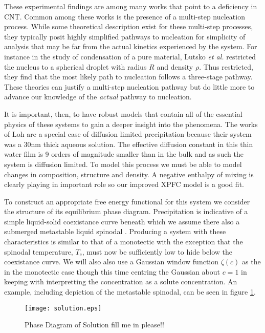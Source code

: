 These experimental findings are among many works that point to a deficiency in
CNT. Common among these works is the presence of a multi-step nucleation
process. While some theoretical description exist for these multi-step
processes, they typically posit highly simplified pathways to nucleation for
simplicity of analysis that may be far from the actual kinetics experienced by
the system.  For instance in the study of condensation of a pure material,
Lutsko \textit{et al.} \cite{LUTSKO15} restricted the nucleus to a spherical
droplet with radius $R$ and density $\rho$. Thus restricted, they find that the
most likely path to nucleation follows a three-stage pathway.  These theories
can justify a multi-step nucleation pathway but do little more to advance our
knowledge of the \textit{actual} pathway to nucleation.

It is important, then, to have robust models that contain all of the essential
physics of these systems to gain a deeper insight into the phenomena. The works
of Loh \cite{LOH17} are a special case of diffusion limited precipitation because
their system was a 30nm thick aqueous solution. The effective diffusion
constant in this thin water film is 9 orders of magnitude smaller than in the
bulk and as such the system is diffusion limited. To model this process we must
be able to  model changes in composition, structure and density. A negative
enthalpy of mixing is clearly playing in important role so our improved XPFC
model is a good fit.

To construct an appropriate free energy functional for this system we consider
the structure of its equilibrium phase diagram. Precipitation is indicative of
a simple liquid-solid coexistance curve beneath which we assume there also a 
submerged metastable liquid spinodal \cite{DAVEY13}. Producing a system with
these characteristics is similar to that of a monotectic with the exception
that the spinodal temperature, $T_c$, must now be sufficiently low to hide
below the coexistance curve. We will also also use a Gaussian window function
$\zeta(c)$ as the in the monotectic case though this time centring the Gaussian
about $c = 1$ in keeping with interpretting the concentration as a solute
concentration.  An example, including depiction of the metastable spinodal, can
be seen in figure \ref{fig:precip_phase_dia}.

\begin{figure}
    \centering	
    \texttt{[image: solution.eps]}
    \caption[Coexistance Phase Diagram with Metastable Spinodal]{
        \label{fig:precip_phase_dia} Phase Diagram of Solution \color{ForestGreen} fill
        me in please!!
    }
\end{figure}

